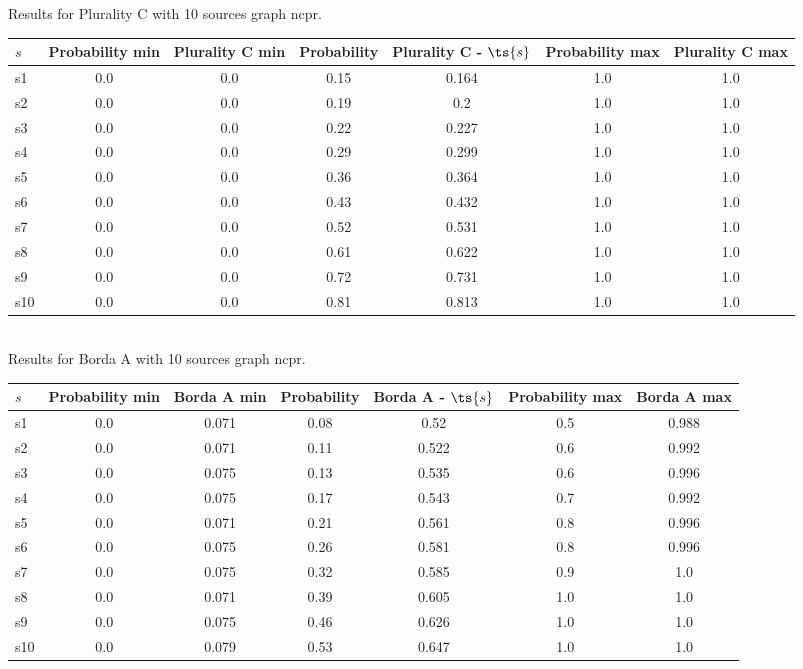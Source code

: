 \documentclass{article}
\begin{document}
\noindent Results for Plurality C with 10 sources graph ncpr.

\noindent\begin{tabular}{|l|c|c|c|c|c|c|}
\hline
$s$& Probability min & Plurality C min & Probability & Plurality C - $\ts{s}$ & Probability max & Plurality C max\\
\hline
s1 &0.0 & 0.0 & 0.15 & 0.164 & 1.0 & 1.0\\
\hline
s2 &0.0 & 0.0 & 0.19 & 0.2 & 1.0 & 1.0\\
\hline
s3 &0.0 & 0.0 & 0.22 & 0.227 & 1.0 & 1.0\\
\hline
s4 &0.0 & 0.0 & 0.29 & 0.299 & 1.0 & 1.0\\
\hline
s5 &0.0 & 0.0 & 0.36 & 0.364 & 1.0 & 1.0\\
\hline
s6 &0.0 & 0.0 & 0.43 & 0.432 & 1.0 & 1.0\\
\hline
s7 &0.0 & 0.0 & 0.52 & 0.531 & 1.0 & 1.0\\
\hline
s8 &0.0 & 0.0 & 0.61 & 0.622 & 1.0 & 1.0\\
\hline
s9 &0.0 & 0.0 & 0.72 & 0.731 & 1.0 & 1.0\\
\hline
s10 &0.0 & 0.0 & 0.81 & 0.813 & 1.0 & 1.0\\
\hline
\end{tabular}\\

\noindent Results for Borda A with 10 sources graph ncpr.

\noindent\begin{tabular}{|l|c|c|c|c|c|c|}
\hline
$s$& Probability min & Borda A min & Probability & Borda A - $\ts{s}$ & Probability max & Borda A max\\
\hline
s1 &0.0 & 0.071 & 0.08 & 0.52 & 0.5 & 0.988\\
\hline
s2 &0.0 & 0.071 & 0.11 & 0.522 & 0.6 & 0.992\\
\hline
s3 &0.0 & 0.075 & 0.13 & 0.535 & 0.6 & 0.996\\
\hline
s4 &0.0 & 0.075 & 0.17 & 0.543 & 0.7 & 0.992\\
\hline
s5 &0.0 & 0.071 & 0.21 & 0.561 & 0.8 & 0.996\\
\hline
s6 &0.0 & 0.075 & 0.26 & 0.581 & 0.8 & 0.996\\
\hline
s7 &0.0 & 0.075 & 0.32 & 0.585 & 0.9 & 1.0\\
\hline
s8 &0.0 & 0.071 & 0.39 & 0.605 & 1.0 & 1.0\\
\hline
s9 &0.0 & 0.075 & 0.46 & 0.626 & 1.0 & 1.0\\
\hline
s10 &0.0 & 0.079 & 0.53 & 0.647 & 1.0 & 1.0\\
\hline
\end{tabular}\\
\end{document}
